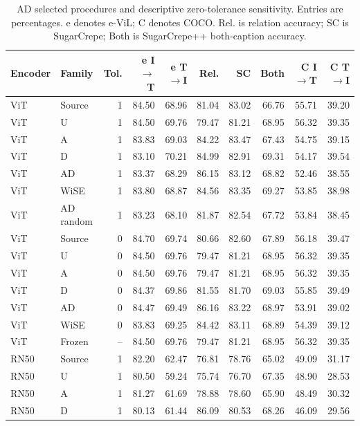 \begin{table}[t]
\centering
\scriptsize
\setlength{\tabcolsep}{3pt}
\begin{tabular}{llrrrrrrrr}
\toprule
Encoder & Family & Tol. & e I$\to$T & e T$\to$I & Rel. & SC & Both & C I$\to$T & C T$\to$I\\
\midrule
ViT & Source & 1 & 84.50 & 68.96 & 81.04 & 83.02 & 66.76 & 55.71 & 39.20\\
ViT & U & 1 & 84.50 & 69.76 & 79.47 & 81.21 & 68.95 & 56.32 & 39.35\\
ViT & A & 1 & 83.83 & 69.03 & 84.22 & 83.47 & 67.43 & 54.75 & 39.15\\
ViT & D & 1 & 83.10 & 70.21 & 84.99 & 82.91 & 69.31 & 54.17 & 39.54\\
ViT & AD & 1 & 83.37 & 68.29 & 86.15 & 83.12 & 68.82 & 52.46 & 38.55\\
ViT & WiSE & 1 & 83.80 & 68.87 & 84.56 & 83.35 & 69.27 & 53.85 & 38.98\\
ViT & AD random & 1 & 83.23 & 68.10 & 81.87 & 82.54 & 67.72 & 53.84 & 38.45\\
ViT & Source & 0 & 84.70 & 69.74 & 80.66 & 82.60 & 67.89 & 56.18 & 39.47\\
ViT & U & 0 & 84.50 & 69.76 & 79.47 & 81.21 & 68.95 & 56.32 & 39.35\\
ViT & A & 0 & 84.50 & 69.76 & 79.47 & 81.21 & 68.95 & 56.32 & 39.35\\
ViT & D & 0 & 84.37 & 69.86 & 81.55 & 81.70 & 69.03 & 55.85 & 39.49\\
ViT & AD & 0 & 84.47 & 69.49 & 86.16 & 83.22 & 68.97 & 53.91 & 39.02\\
ViT & WiSE & 0 & 83.83 & 69.25 & 84.42 & 83.11 & 68.89 & 54.39 & 39.12\\
ViT & Frozen & -- & 84.50 & 69.76 & 79.47 & 81.21 & 68.95 & 56.32 & 39.35\\
RN50 & Source & 1 & 82.20 & 62.47 & 76.81 & 78.76 & 65.02 & 49.09 & 31.17\\
RN50 & U & 1 & 80.50 & 59.24 & 75.74 & 76.70 & 67.35 & 48.90 & 28.53\\
RN50 & A & 1 & 81.27 & 61.69 & 78.88 & 78.60 & 65.90 & 48.49 & 30.32\\
RN50 & D & 1 & 80.13 & 61.44 & 86.09 & 80.53 & 68.26 & 46.09 & 29.56\\
\bottomrule
\end{tabular}
\caption{AD selected procedures and descriptive zero-tolerance sensitivity. Entries are percentages. e denotes e-ViL; C denotes COCO. Rel. is relation accuracy; SC is SugarCrepe; Both is SugarCrepe++ both-caption accuracy.}\label{tab:admetrics0}
\end{table}


